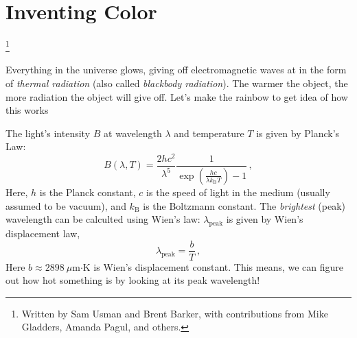 \chapter{Inventing Color}
\footnote{Written by Sam Usman and Brent Barker, with contributions from Mike
Gladders, Amanda Pagul, and others.}

Everything in the universe glows, giving off electromagnetic waves at in the
form of \emph{thermal radiation} (also called \emph{blackbody radiation}). The
warmer the object, the more radiation the object will give off.
Let's make the rainbow to get idea of how this works
\nopagebreak

%

The light's intensity $B$ at wavelength $\lambda$ and
temperature $T$ is given by Planck's Law:
%
\begin{equation}
\label{eq:planck}
 B(\lambda, T) = \frac{2 h c^2}{\lambda^5}
 \frac{1}{\exp\left( \frac{hc}{\lambda k_\textrm{B} T} \right) - 1} \,,
\end{equation}
%
Here, $h$ is the Planck constant, $c$ is the speed of light in the medium
(usually assumed to be vacuum), and $k_\textrm{B}$ is the Boltzmann constant.
The \emph{brightest} (peak) wavelength can be calculted using Wien's law:
$\lambda_\textrm{peak}$ is given by Wien's displacement law,
%
\begin{equation}\label{ic:eq:wien}
	\lambda_\textrm{peak} = \frac{b}{T} \,,
\end{equation}
%
Here $b \approx 2898\:\mu$m$\cdot$K is Wien's displacement constant.
This means, we can figure out how hot something is by looking at its peak
wavelength!

